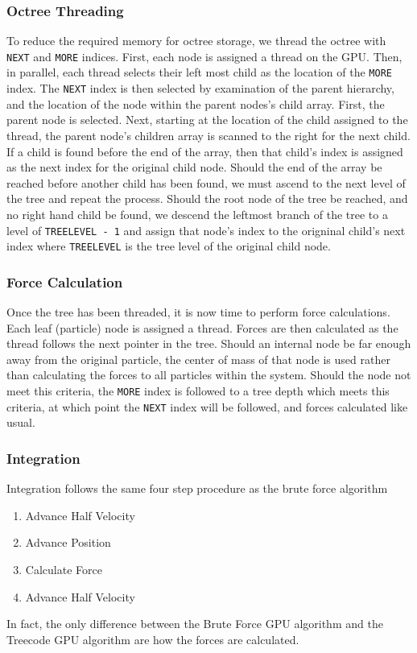 \documentclass{thesis}
\begin{document}
\subsubsection{Octree Threading}
To reduce the required memory for octree storage, we thread the octree with \verb|NEXT| and \verb|MORE| indices. First, each node is assigned a thread on the GPU. Then, in parallel, each thread selects their left most child as the location of the \verb|MORE| index. The \verb|NEXT| index is then selected by examination of the parent hierarchy, and the location of the node within the parent nodes's child array. First, the parent node is selected. Next, starting at the location of the child assigned to the thread, the parent node's children array is scanned to the right for the next child. If a child is found before the end of the array, then that child's index is assigned as the next index for the original child node. Should the end of the array be reached before another child has been found, we must ascend to the next level of the tree and repeat the process. Should the root node of the tree be reached, and no right hand child be found, we descend the leftmost branch of the tree to a level of \verb|TREELEVEL - 1| and assign that node's index to the origninal child's next index where \verb|TREELEVEL| is the tree level of the original child node.
\subsubsection{Force Calculation}
Once the tree has been threaded, it is now time to perform force calculations. Each leaf (particle) node is assigned a thread. Forces are then calculated as the thread follows the next pointer in the tree. Should an internal node be far enough away from the original particle, the center of mass of that node is used rather than calculating the forces to all particles within the system. Should the node not meet this criteria, the \verb|MORE| index is followed to a tree depth which meets this criteria, at which point the \verb|NEXT| index will be followed, and forces calculated like usual.
\subsubsection{Integration}
Integration follows the same four step procedure as the brute force algorithm
\begin{enumerate}
    \item Advance Half Velocity
    \item Advance Position
    \item Calculate Force
    \item Advance Half Velocity
\end{enumerate}
In fact, the only difference between the Brute Force GPU algorithm and the Treecode GPU algorithm are how the forces are calculated. 
\end{document}
